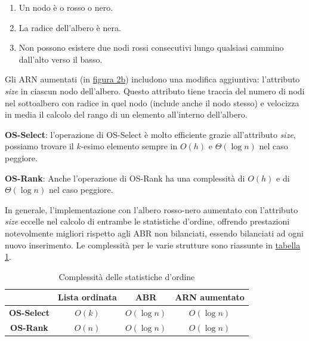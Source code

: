 \documentclass[onecolumn]{article}
\begin{document}
\begin{enumerate}
	\setlength\itemsep{-0.25em}
	\item Un nodo è o rosso o nero.
	\item La radice dell'albero è nera.
	\item Non possono esistere due nodi rossi consecutivi lungo qualsiasi cammino dall'alto verso il basso.
\end{enumerate}

Gli ARN aumentati (in \hyperref[fig:alberi]{figura 2b}) includono una modifica aggiuntiva: l'attributo \textit{size} in ciascun nodo dell'albero. Questo attributo tiene traccia del numero di nodi nel sottoalbero con radice in quel nodo (include anche il nodo stesso) e velocizza in media il calcolo del rango di un elemento all'interno dell'albero. \vspace{1em}

\textbf{OS-Select}: l'operazione di OS-Select è molto efficiente grazie all'attributo \textit{size}, possiamo trovare il $k$-esimo elemento sempre in $O(h)$ e $\Theta(\log n)$ nel caso peggiore. \vspace{0.5em}

\textbf{OS-Rank}: Anche l'operazione di OS-Rank ha una complessità di $O(h)$ e di $\Theta(\log n)$ nel caso peggiore. \vspace{1em}

In generale, l'implementazione con l'albero rosso-nero aumentato con l'attributo \textit{size} eccelle nel calcolo di entrambe le statistiche d'ordine, offrendo prestazioni notevolmente migliori rispetto agli ABR non bilanciati, essendo bilanciati ad ogni nuovo inserimento. Le complessità per le varie strutture sono riassunte in \hyperref[tab:complessita]{tabella 1}.

\begin{table}[t]
	\centering
	\begin{tabular}{|c|c|c|c|}
		\hline
		& Lista ordinata & \hspace*{2em}ABR\hspace*{2em} & ARN aumentato \\
		\hline
		\textbf{OS-Select} & $O(k)$         & $O(\log n)$                   & $O(\log n)$   \\
		\hline
		\textbf{OS-Rank}   & $O(n)$         & $O(\log n)$                   & $O(\log n)$   \\
		\hline
	\end{tabular}
	\caption{Complessità delle statistiche d'ordine}
	\label{tab:complessita}
\end{table}
\end{document}
